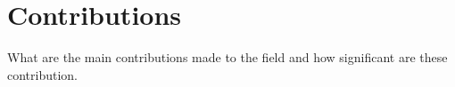 \section{Contributions}

What are the main contributions made to the field and how significant are these contribution.